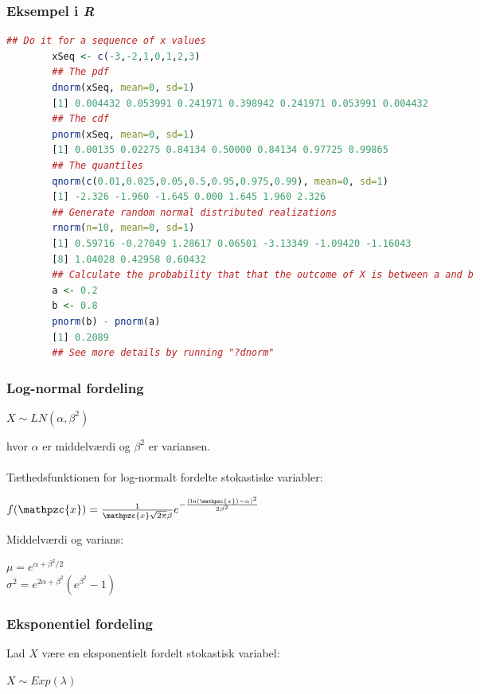 \documentclass{article}
\newcommand{\mellemrum}{\vspace{2 ex}}
\newcommand{\cent}[1]{ \mellemrum \begin{center} #1\end{center} \mellemrum }
\newcommand{\op}[1]{\operatorname{#1}}
\newcommand{\parenthesis}[1]{\ensuremath{\left( #1 \right)}}
\newcommand{\script}[1]{\mathpzc{#1}}
\begin{document}
	\subsubsection{Eksempel i \textit{R}}
	
	\begin{lstlisting}[language=R]
		## Do it for a sequence of x values
		xSeq <- c(-3,-2,1,0,1,2,3)
		## The pdf
		dnorm(xSeq, mean=0, sd=1)
		[1] 0.004432 0.053991 0.241971 0.398942 0.241971 0.053991 0.004432
		## The cdf
		pnorm(xSeq, mean=0, sd=1)
		[1] 0.00135 0.02275 0.84134 0.50000 0.84134 0.97725 0.99865
		## The quantiles
		qnorm(c(0.01,0.025,0.05,0.5,0.95,0.975,0.99), mean=0, sd=1)
		[1] -2.326 -1.960 -1.645 0.000 1.645 1.960 2.326
		## Generate random normal distributed realizations
		rnorm(n=10, mean=0, sd=1)
		[1] 0.59716 -0.27049 1.28617 0.06501 -3.13349 -1.09420 -1.16043
		[8] 1.04028 0.42958 0.60432
		## Calculate the probability that that the outcome of X is between a and b
		a <- 0.2
		b <- 0.8
		pnorm(b) - pnorm(a)
		[1] 0.2089
		## See more details by running "?dnorm" \end{lstlisting}
	
	\subsubsection{Log-normal fordeling}
	
	\cent{$X \sim LN(\alpha,\beta^2)$}
	
	hvor $\alpha$ er middelværdi og $\beta^2$ er variansen.\\\\
	
	Tæthedsfunktionen for log-normalt fordelte stokastiske variabler:
	
	\cent{$ f(\script{x}) = \frac{1}{\script{x}\sqrt{2\pi}\beta}e^{-\frac{\parenthesis{\op{ln}(\script{x}) - \alpha}^2}{2\beta^2}} $}
	
	Middelværdi og varians:
	
	\cent{$ \mu = e^{\alpha + \beta^2 / 2} $ \\
			$ \sigma^2 = e^{2\alpha +\beta^2 }(e^{\beta^2}-1) $}
	
	\subsubsection{Eksponentiel fordeling}
	
	Lad $X$ være en eksponentielt fordelt stokastisk variabel:
	
	\cent{$ X \sim Exp(\lambda) $}
	
\end{document}

